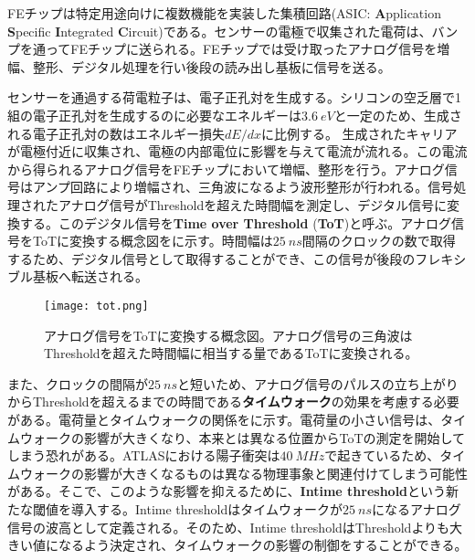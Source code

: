 FEチップは特定用途向けに複数機能を実装した集積回路(ASIC: \textbf{A}pplication \textbf{S}pecific \textbf{I}ntegrated \textbf{C}ircuit)である。センサーの電極で収集された電荷は、バンプを通ってFEチップに送られる。FEチップでは受け取ったアナログ信号を増幅、整形、デジタル処理を行い後段の読み出し基板に信号を送る。

センサーを通過する荷電粒子は、電子正孔対を生成する。シリコンの空乏層で1組の電子正孔対を生成するのに必要なエネルギーは$3.6\ \si{eV}$と一定のため、生成される電子正孔対の数はエネルギー損失$dE/dx$に比例する。
生成されたキャリアが電極付近に収集され、電極の内部電位に影響を与えて電流が流れる。この電流から得られるアナログ信号をFEチップにおいて増幅、整形を行う。アナログ信号はアンプ回路により増幅され、三角波になるよう波形整形が行われる。信号処理されたアナログ信号がThresholdを超えた時間幅を測定し、デジタル信号に変換する。このデジタル信号を\textbf{Time over Threshold} (\textbf{ToT})と呼ぶ。アナログ信号をToTに変換する概念図をに示す。時間幅は$25\ \si{ns}$間隔のクロックの数で取得するため、デジタル信号として取得することができ、この信号が後段のフレキシブル基板へ転送される。

\begin{figure}[tbp]
  \centering
  \texttt{[image: tot.png]}
  \caption[アナログ信号をToTに変換する概念図]{アナログ信号をToTに変換する概念図。アナログ信号の三角波はThresholdを超えた時間幅に相当する量であるToTに変換される。}
  \label{fig:tot}
\end{figure}

また、クロックの間隔が$25\ \si{ns}$と短いため、アナログ信号のパルスの立ち上がりからThresholdを超えるまでの時間である\textbf{タイムウォーク}の効果を考慮する必要がある。電荷量とタイムウォークの関係をに示す。電荷量の小さい信号は、タイムウォークの影響が大きくなり、本来とは異なる位置からToTの測定を開始してしまう恐れがある。ATLASにおける陽子衝突は$40\ \si{MHz}$で起きているため、タイムウォークの影響が大きくなるものは異なる物理事象と関連付けてしまう可能性がある。そこで、このような影響を抑えるために、\textbf{Intime threshold}という新たな閾値を導入する。Intime thresholdはタイムウォークが$25\ \si{ns}$になるアナログ信号の波高として定義される。そのため、Intime thresholdはThresholdよりも大きい値になるよう決定され、タイムウォークの影響の制御をすることができる。

